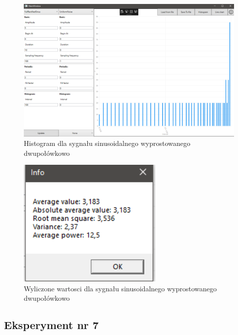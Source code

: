 \documentclass[12pt]{article}
\begin{document}
\begin{figure}[H]
 \centering
 \includegraphics[width=14cm]{images/full1hist.PNG}
 \vspace{-0.3cm}
 \caption{Histogram dla sygnału sinusoidalnego wyprostowanego dwupołówkowo}
 \label{gui}
\end{figure}

\begin{figure}[H]
 \centering
 \includegraphics[width=7cm]{images/full1info.PNG}
 \vspace{-0.3cm}
 \caption{Wyliczone wartosci dla sygnału sinusoidalnego wyprostowanego dwupołówkowo}
 \label{gui}
\end{figure}




\subsection{Eksperyment nr 7 }
\end{document}
